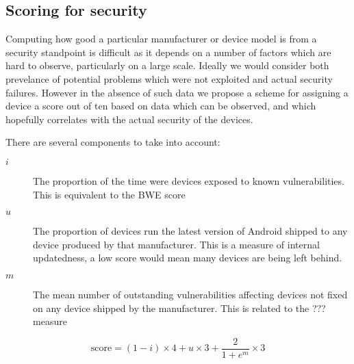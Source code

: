 \subsection{Scoring for security}

Computing how good a particular manufacturer or device model is from a security standpoint is difficult as it depends on a number of factors which are hard to observe, particularly on a large scale.
Ideally we would consider both prevelance of potential problems which were not exploited and actual security failures.
However in the absence of such data we propose a scheme for assigning a device a score out of ten based on data which can be observed, and which hopefully correlates with the actual security of the devices.

There are several components to take into account:
\begin{description}
  \item[$i$] The proportion of the time were devices exposed to known vulnerabilities. This is equivalent to the BWE score \cite{TODO}
  \item[$u$] The proportion of devices run the latest version of Android shipped to any device produced by that manufacturer. This is a measure of internal updatedness, a low score would mean many devices are being left behind.
  \item[$m$] The mean number of outstanding vulnerabilities affecting devices not fixed on any device shipped by the manufacturer. This is related to the ??? measure \cite{TODO}
\end{description}
\begin{equation}
\mathrm{score} = (1 - i)\times 4 + u \times 3 + \frac{2}{1+e^m} \times 3
\end{equation}
